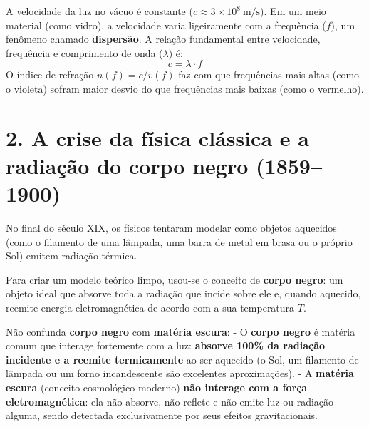 \documentclass[
  brazilian,
]{report}
\begin{document}
\begin{tcolorbox}[enhanced jigsaw, arc=.35mm, bottomrule=.15mm, bottomtitle=1mm, breakable, colback=white, colbacktitle=quarto-callout-note-color!10!white, colframe=quarto-callout-note-color-frame, coltitle=black, left=2mm, leftrule=.75mm, opacityback=0, opacitybacktitle=0.6, rightrule=.15mm, title=\textcolor{quarto-callout-note-color}{\faInfo}\hspace{0.5em}{🔬 Quer se aprofundar na Física? Espectro e Dispersão Óptica}, titlerule=0mm, toprule=.15mm, toptitle=1mm]

A velocidade da luz no vácuo é constante
(\(c \approx 3 \times 10^8\ \text{m/s}\)). Em um meio material (como
vidro), a velocidade varia ligeiramente com a frequência (\(f\)), um
fenômeno chamado \textbf{dispersão}. A relação fundamental entre
velocidade, frequência e comprimento de onda (\(\lambda\)) é:
\[c = \lambda \cdot f\] O índice de refração \(n(f) = c / v(f)\) faz com
que frequências mais altas (como o violeta) sofram maior desvio do que
frequências mais baixas (como o vermelho).

\end{tcolorbox}

\section{2. A crise da física clássica e a radiação do corpo negro
(1859--1900)}\label{a-crise-da-fuxedsica-cluxe1ssica-e-a-radiauxe7uxe3o-do-corpo-negro-18591900}

No final do século XIX, os físicos tentaram modelar como objetos
aquecidos (como o filamento de uma lâmpada, uma barra de metal em brasa
ou o próprio Sol) emitem radiação térmica.

Para criar um modelo teórico limpo, usou-se o conceito de \textbf{corpo
negro}: um objeto ideal que absorve toda a radiação que incide sobre ele
e, quando aquecido, reemite energia eletromagnética de acordo com a sua
temperatura \(T\).

\begin{tcolorbox}[enhanced jigsaw, arc=.35mm, bottomrule=.15mm, bottomtitle=1mm, breakable, colback=white, colbacktitle=quarto-callout-caution-color!10!white, colframe=quarto-callout-caution-color-frame, coltitle=black, left=2mm, leftrule=.75mm, opacityback=0, opacitybacktitle=0.6, rightrule=.15mm, title=\textcolor{quarto-callout-caution-color}{\faFire}\hspace{0.5em}{⚠️ Cuidado conceitual: Corpo Negro vs.~Matéria Escura}, titlerule=0mm, toprule=.15mm, toptitle=1mm]

Não confunda \textbf{corpo negro} com \textbf{matéria escura}: - O
\textbf{corpo negro} é matéria comum que interage fortemente com a luz:
\textbf{absorve 100\% da radiação incidente e a reemite termicamente} ao
ser aquecido (o Sol, um filamento de lâmpada ou um forno incandescente
são excelentes aproximações). - A \textbf{matéria escura} (conceito
cosmológico moderno) \textbf{não interage com a força eletromagnética}:
ela não absorve, não reflete e não emite luz ou radiação alguma, sendo
detectada exclusivamente por seus efeitos gravitacionais.

\end{tcolorbox}
\end{document}
